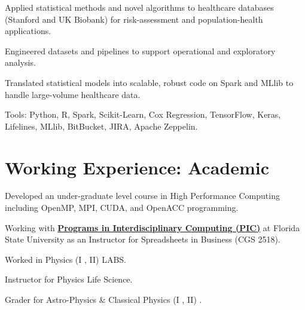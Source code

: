 \documentclass[]{template}
\begin{document}
\sectionsep
{}

\vspace{\topsep} %
\begin{tightemize}
\item Applied statistical methods and novel algorithms to healthcare databases (Stanford and UK Biobank) for risk-assessment and population-health applications.

\item Engineered datasets and pipelines to support operational and exploratory analysis.

\item Translated statistical models into scalable, robust code on Spark and MLlib to handle large-volume healthcare data.

\item Tools: Python, R, Spark, Scikit-Learn, Cox Regression, TensorFlow, Keras, Lifelines, MLlib, BitBucket, JIRA, Apache Zeppelin.
\end{tightemize}


\sectionsep
\section{Working Experience: Academic}
\sectionsep


\vspace{\topsep}
\begin{tightemize}
\item Developed an under-graduate level course in High Performance Computing including OpenMP, MPI, CUDA, and OpenACC programming.
\item Working with \textbf{\href{https://pic.fsu.edu/}{Programs in Interdisciplinary Computing (PIC)}} at Florida State University as an Instructor for Spreadsheets in Business (CGS 2518). 
\end{tightemize}

\sectionsep


\begin{tightemize}
\item Worked in Physics (I , II) LABS.
\item Instructor for Physics Life Science.
\item Grader for Astro-Physics \& Classical Physics (I , II) .
\end{tightemize}
\end{document}
